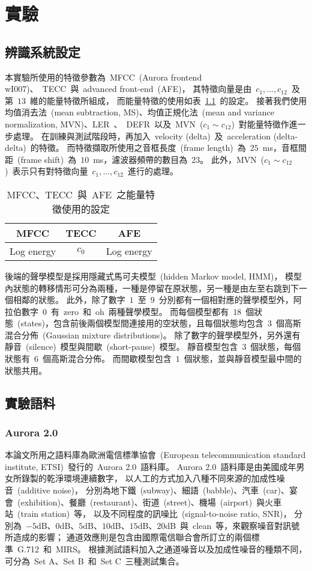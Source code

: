 \chapter{實驗}
\label{ch:exp}
\section{辨識系統設定}
本實驗所使用的特徵參數為~MFCC~(Aurora frontend wI007)、~TECC~與~advanced front-end~(AFE)，
其特徵向量是由~$c_1,...,c_{12}$~及第~$13$~維的能量特徵所組成，
而能量特徵的使用如表~\ref{table:energy_use}~的設定。
接著我們使用均值消去法~(mean subtraction, MS)、均值正規化法~(mean and variance normalization, MVN)、LER~、~DEFR~以及~MVN~($c_1 \sim c_{12}$)~對能量特徵作進一步處理。
在訓練與測試階段時，再加入~velocity (delta)~及~acceleration (delta-delta)~的特徵。
而特徵擷取所使用之音框長度~(frame length)~為~$25$~ms，音框間距~(frame shift)~為~$10$~ms，濾波器頻帶的數目為~$23$。
此外，MVN~($c_1 \sim c_{12}$)~表示只有對特徵向量~$c_1,...,c_{12}$~進行的處理。

\begin{table}[!htb]
\renewcommand{\arraystretch}{1.1}
\centering
\caption{MFCC、TECC~與~AFE~之能量特徵使用的設定}
\label{table:energy_use}  
\vspace{2mm}
\begin{tabular}{ccc}
\hline 
	MFCC & TECC & AFE  \\ 
\hline
{Log energy} & {$c_0$} & {Log energy} \\
\hline
\end{tabular}
\end{table}

後端的聲學模型是採用隱藏式馬可夫模型~(hidden Markov model, HMM)，
模型內狀態的轉移情形可分為兩種，一種是停留在原狀態，另一種是由左至右跳到下一個相鄰的狀態。
此外，除了數字~$1$~至~$9$~分別都有一個相對應的聲學模型外，阿拉伯數字~$0$~有~zero~和~oh~兩種聲學模型。
而每個模型都有~$18$~個狀態~(states)，包含前後兩個模型間連接用的空狀態，且每個狀態均包含~$3$~個高斯混合分佈~(Gaussian mixture distributions)。
除了數字的聲學模型外，另外還有靜音~(silence)~模型與間歇~(short-pause)~模型。
靜音模型包含~$3$~個狀態，每個狀態有~$6$~個高斯混合分佈。
而間歇模型包含~$1$~個狀態，並與靜音模型最中間的狀態共用。

\section{實驗語料}
\subsection{Aurora 2.0}
本論文所用之語料庫為歐洲電信標準協會~(European telecommunication standard institute, ETSI)~發行的~Aurora 2.0~語料庫。
Aurora 2.0~語料庫是由美國成年男女所錄製的乾淨環境連續數字，
以人工的方式加入八種不同來源的加成性噪音~(additive noise)，
分別為地下鐵~(subway)、細語~(babble)、汽車~(car)、宴會~(exhibition)、餐廳~(restaurant)、街道~(street)、機場~(airport)~與火車站~(train station)~等，
以及不同程度的訊噪比~(signal-to-noise ratio, SNR)，
分別為~$-5$dB、$0$dB、$5$dB、$10$dB、$15$dB、$20$dB~與~clean~等，來觀察噪音對訊號所造成的影響；
通道效應則是包含由國際電信聯合會所訂立的兩個標準~G.712~和~MIRS。
根據測試語料加入之通道噪音以及加成性噪音的種類不同，可分為~Set A、Set B~和~Set C~三種測試集合。
